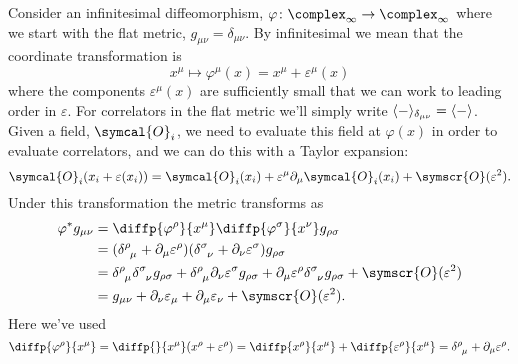 \documentclass[fleqn]{NotesClass}
\newcommand{\quantumField}[1]{\symcal{#1}}
\DeclarePairedDelimiter{\correlator}{\langle}{\rangle}
\newcommand{\order}{\symscr{O}}
\begin{document}
    Consider an infinitesimal diffeomorphism, \(\varphi \colon \complex_{\infty} \to \complex_{\infty}\) where we start with the flat metric, \(g_{\mu\nu} = \delta_{\mu\nu}\).
    By infinitesimal we mean that the coordinate transformation is
    \begin{equation}
        x^\mu \mapsto \varphi^\mu(x) = x^\mu + \varepsilon^\mu(x)
    \end{equation}
    where the components \(\varepsilon^\mu(x)\) are sufficiently small that we can work to leading order in \(\varepsilon\).
    For correlators in the flat metric we'll simply write \(\correlator{-}_{\delta_{\mu\nu}} = \correlator{-}\).
    Given a field, \(\quantumField{O}_i\), we need to evaluate this field at \(\varphi(x)\) in order to evaluate correlators, and we can do this with a Taylor expansion:
    \begin{equation}
        \quantumField{O}_i(x_i + \varepsilon(x_i)) = \quantumField{O}_i(x_i) + \varepsilon^\mu \partial_\mu \quantumField{O}_i(x_i) + \order(\varepsilon^2).
    \end{equation}
    Under this transformation the metric transforms as
    \begin{align}
        \varphi^*g_{\mu\nu} &= \diffp{\varphi^\rho}{x^\mu} \diffp{\varphi^\sigma}{x^\nu} g_{\rho\sigma}\\
        &= (\tensor{\delta}{^\rho_\mu} + \partial_\mu \varepsilon^\rho)(\tensor{\delta}{^\sigma_\nu} + \partial_\nu \varepsilon^\sigma)g_{\rho\sigma}\\
        &= \tensor{\delta}{^\rho_\mu} \tensor{\delta}{^\sigma_\nu} g_{\rho\sigma} + \tensor{\delta}{^\rho_\mu} \partial_\nu \varepsilon^\sigma g_{\rho\sigma} + \partial_\mu \varepsilon^\rho \tensor{\delta}{^\sigma_\nu} g_{\rho\sigma} + \order(\varepsilon^2)\\
        &= g_{\mu\nu} + \partial_\nu \varepsilon_\mu + \partial_\mu \varepsilon_\nu + \order(\varepsilon^2).
    \end{align}
    Here we've used
    \begin{equation}
        \diffp{\varphi^\rho}{x^\mu} = \diffp{}{x^\mu}(x^\rho + \varepsilon^\rho) = \diffp{x^\rho}{x^\mu} + \diffp{\varepsilon^\rho}{x^\mu} = \tensor{\delta}{^\rho_\mu} + \partial_\mu \varepsilon^\rho.
    \end{equation}
    
\end{document}
